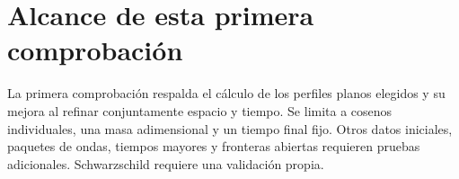 \enlargethispage{\baselineskip}
\section{Alcance de esta primera comprobación}

La primera comprobación respalda el cálculo de los perfiles planos elegidos
y su mejora al refinar conjuntamente espacio y tiempo. Se limita a cosenos
individuales, una masa adimensional y un tiempo final fijo. Otros datos
iniciales, paquetes de ondas, tiempos mayores y fronteras abiertas requieren
pruebas adicionales. Schwarzschild requiere una validación propia.
